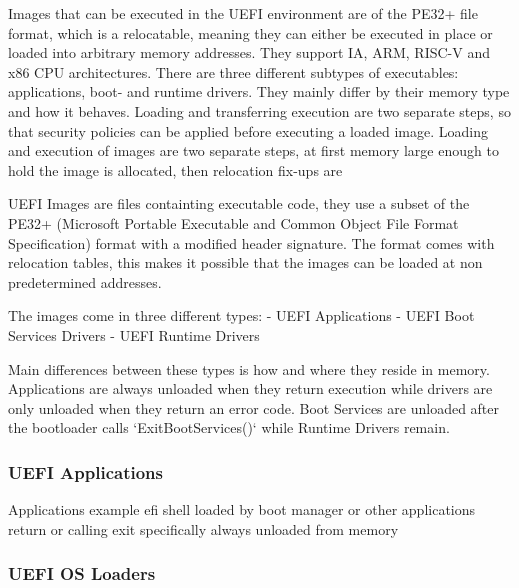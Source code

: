 

Images that can be executed in the \ac{UEFI} environment are of the \ac{PE32}+ file format, which is a relocatable, meaning they can either be executed in place or loaded into arbitrary memory addresses.
They support IA, ARM, RISC-V and x86 CPU architectures.
There are three different subtypes of executables: applications, boot- and runtime drivers. They mainly differ by their memory type and how it behaves. Loading and transferring execution are two separate steps, so that security policies can be applied before executing a loaded image. Loading and execution of images are two separate steps, at first memory large enough to hold the image is allocated, then relocation fix-ups are \cite[2.1.1]{uefi-spec}


UEFI Images are files containting executable code, they use a subset of the PE32+ (Microsoft Portable Executable and Common Object File Format Specification) format with a modified header signature. The format comes with relocation tables, this makes it possible that the images can be loaded at non predetermined addresses.

The images come in three different types:
- UEFI Applications
- UEFI Boot Services Drivers
- UEFI Runtime Drivers

Main differences between these types is  how and where they reside in memory. Applications are always unloaded when they return execution while drivers are only unloaded when they return an error code. Boot Services are unloaded after the bootloader calls `ExitBootServices()` while Runtime Drivers remain.

\subsubsection{\acs{UEFI} Applications}

Applications
example efi shell
loaded by boot manager or other applications
return or calling exit specifically
always unloaded from memory

\subsubsection{UEFI OS Loaders}

